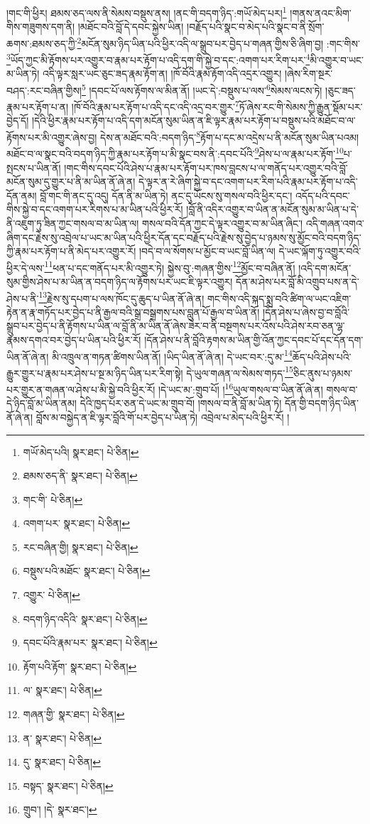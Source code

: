 །གང་གི་ཕྱིར། ཐམས་ཅད་ལས་ནི་སེམས་བསྡུས་ནས། །ནང་གི་བདག་ཉིད་:གཡོ་མེད་པར།\footnote{གཡོ་མེད་པའི།  སྣར་ཐང་།  པེ་ཅིན། } །གནས་ནའང་མིག་གིས་གཟུགས་དག་ནི། །མཐོང་བའི་བློ་དེ་དབང་སྐྱེས་ཡིན། །བརྗོད་པའི་སྣང་བ་མེད་པའི་སྣང་བ་ནི་སྲོག་ཆགས་:ཐམས་ཅད་ཀྱི་\footnote{ཐམས་ཅད་ནི་  སྣར་ཐང་།  པེ་ཅིན། }མངོན་སུམ་ཉིད་ཡིན་པའི་ཕྱིར་འདི་ལ་སྒྲུབ་པར་བྱེད་པ་གཞན་གྱིས་ཅི་ཞིག་བྱ། :གང་གིས་\footnote{གང་གི་  པེ་ཅིན། }ཡོད་ཀྱང་མི་རྟོགས་པར་འགྱུར་བ་རྣམ་པར་རྟོག་པ་འདི་དག་གི་སྐྱེ་བ་དང་:འགག་པར་རིག་པར་\footnote{འགག་པར་  སྣར་ཐང་།  པེ་ཅིན། }མི་འགྱུར་བ་ཡང་མ་ཡིན་ཏེ། འདི་ལྟར་སླར་ཡང་ཅུང་ཟད་རྣམ་རྟོག་ན། །ཁོ་བོའི་རྣམ་རྟོག་འདི་འདྲར་འགྱུར། །ཞེས་རིག་སྔར་བཤད་:རང་བཞིན་གྱིས།\footnote{རང་བཞིན་གྱི།  སྣར་ཐང་།  པེ་ཅིན། } །དབང་པོ་ལས་རྟོགས་ལ་མིན་ནོ། །ཡང་དེ་:བསྡུས་པ་ལས་\footnote{བསྡུས་པའི་མཐོང་  སྣར་ཐང་།  པེ་ཅིན། }སེམས་ལངས་ཏེ། །ཅུང་ཟད་རྣམ་པར་རྟོག་པ་ན། །ཁོ་བོའི་རྣམ་པར་རྟོག་པ་འདི་དང་འདི་འདྲ་བར་གྱུར་\footnote{འགྱུར་  པེ་ཅིན། }ཏོ་ཞེས་རང་གི་སེམས་ཀྱི་རྒྱུན་སྡོམ་པར་བྱེད་དོ། །དེའི་ཕྱིར་རྣམ་པར་རྟོག་པ་འདི་དག་མངོན་སུམ་ཡིན་ན་ཇི་ལྟར་རྣམ་པར་རྟོག་པ་བསྡུས་པའི་མཐོང་བ་ལ་རྟོགས་པར་མི་འགྱུར་ཞེས་བྱ། དེས་ན་མཐོང་བའི་:བདག་ཉིད་\footnote{བདག་ཉིད་འདིའི་  སྣར་ཐང་།  པེ་ཅིན། }རྟོག་པ་དང་མ་འདྲེས་པ་ནི་མངོན་སུམ་ཡིན་པའམ། མཐོང་བ་ལ་སྣང་བའི་བདག་ཉིད་ཀྱི་རྣམ་པར་རྟོག་པ་མི་སྣང་བས་ནི་:དབང་པོའི་\footnote{དབང་པོའི་རྣམ་པར་  སྣར་ཐང་།  པེ་ཅིན། }ཤེས་པ་ལ་རྣམ་པར་རྟོག་\footnote{རྟོག་པའི་རྟོག་  སྣར་ཐང་།  པེ་ཅིན། }པ་སྤངས་པ་ཡིན་ནོ། །གང་གིས་དབང་པོའི་ཤེས་པ་རྣམ་པར་རྟོག་པར་ཁས་བླངས་པ་ལ་གནོད་པར་འགྱུར་བའི་བློ་མངོན་སུམ་དུ་གྱུར་པ་ནི་མ་ཡིན་ནོ་ཞེ་ན། དེ་ལྟར་ན་རེ་ཞིག་སྐྱེ་བ་དང་འགག་པར་རིག་པའི་རྣམ་པར་རྟོག་པ་འདི་དོན་ནམ། བློ་གང་གི་ནང་དུ་འདུ། དོན་ནི་མ་ཡིན་ཏེ། ནང་དུ་ཡོངས་སུ་གསལ་བའི་ཕྱིར་དང་། འདོད་པའི་དབང་གིས་སྐྱེ་བ་དང་འགག་པར་རིགས་པ་མ་ཡིན་པའི་ཕྱིར་རོ། །བློ་ནི་འདིར་འགྱུར་བ་ཡིན་ན་མངོན་སུམ་མ་ཡིན་པ་དེ་ནི་འཇུག་ཏུ་ཟིན་ཀྱང་གསལ་བ་མ་ཡིན་ལ། གསལ་བའི་དོན་ཀྱང་དེ་ལྟར་འགྱུར་བ་མ་ཡིན་ཞིང་། འདི་གཞན་འགའ་ཞིག་དང་རྗེས་སུ་འབྲེལ་པ་ཡང་མ་ཡིན་པའི་ཕྱིར་དོན་དང་བརྗོད་པའི་རྗེས་སུ་བྱེད་པ་ཉམས་སུ་མྱོང་བའི་བདག་ཉིད་ཀྱི་རྣམ་པར་རྟོག་པ་ནི་མེད་པར་འགྱུར་རོ། །བདེ་བ་ལ་སོགས་པ་མྱོང་བ་ཡང་བློ་ཡིན་ལ། དེ་ཡང་ལྐོག་ཏུ་འགྱུར་བའི་ཕྱིར་དེ་ལས་\footnote{ལ་  སྣར་ཐང་།  པེ་ཅིན། }ཕན་པ་དང་གནོད་པར་མི་འགྱུར་ཏེ། སྐྱེས་བུ་:གཞན་གྱིས་\footnote{གཞན་གྱི་  སྣར་ཐང་།  པེ་ཅིན། }མྱོང་བ་བཞིན་ནོ། །འདི་དག་མངོན་སུམ་གྱིས་ཤེས་པ་མ་ཡིན་ན་བདག་ཉིད་ལ་རྟོགས་པར་ཡང་ཇི་ལྟར་འགྱུར། དོན་མ་ཤེས་པར་བློ་མི་འགྲུབ་པས་ན་དེ་ཤེས་པ་ནི་\footnote{ན་  སྣར་ཐང་།  པེ་ཅིན། }རྗེས་སུ་དཔག་པ་ལས་ཁོང་དུ་ཆུད་པ་ཡིན་ནོ་ཞེ་ན། གང་གིས་འདི་སྐད་སྨྲ་བའི་ཚིག་ལ་ཡང་འཇིག་རྟེན་ན་རྣ་གཏོད་པར་བྱེད་པ་ནི་རྒྱལ་བའི་སྒྲ་བསྒྲགས་པས་བླུན་པོ་རྒྱལ་བ་ཡིན་ནོ། །དོན་ཤེས་པ་ཞེས་བྱ་བ་བློའི་སྒྲུབ་པར་བྱེད་པ་ནི་རྟོགས་པ་ཡིན་ལ་བློ་ནི་མ་ཡིན་ནོ་ཞེས་ཟེར་བ་ནི་བསྔགས་པར་འོས་པའི་ཤེས་རབ་ཅན་ལྷ་རྣམས་དགའ་བར་བྱེད་པ་ཡིན་པའི་ཕྱིར་རོ། །དོན་ཤེས་པ་ནི་བློའི་རྟགས་མ་ཡིན་གྱི་འོན་ཀྱང་དབང་པོ་དང་དོན་དག་ཡིན་ནོ་ཞེ་ན། མི་འཁྲུལ་ན་གཏན་ཚིགས་ཡིན་ནོ། །ཡིད་ཡིན་ནོ་ཞེ་ན། དེ་ཡང་བར་:དུ་མ་\footnote{དུ་  སྣར་ཐང་།  པེ་ཅིན། }ཆོད་པའི་ཤེས་པའི་རྒྱུར་གྱུར་པ་རྣམ་པར་ཤེས་པ་སྔ་མ་ཉིད་ཡིན་པར་རིག་སྟེ། དེ་ཡུལ་གཞན་ལ་སེམས་གཏད་\footnote{བསྟད་  སྣར་ཐང་།  པེ་ཅིན། }ཅིང་ནུས་པ་ཉམས་པར་གྱུར་ན་གཞན་ལ་ཤེས་པ་མི་སྐྱེ་བའི་ཕྱིར་རོ། །དེ་ཡང་མ་:གྲུབ་པོ། །\footnote{གྲུབ་། །དེ་  སྣར་ཐང་། }ཡུལ་གསལ་བ་ཡིན་ནོ་ཞེ་ན། གསལ་བ་དེ་ཉིད་བློ་མ་ཡིན་ནམ། དེའི་ཁྱད་པར་ཅན་དེ་ཡང་མ་གྲུབ་བོ། །གསལ་བ་ནི་བློ་མ་ཡིན་ཏེ། དོན་གྱི་བདག་ཉིད་ཡིན་ནོ་ཞེ་ན། བློས་མ་བསྐྱེད་ན་ཇི་ལྟར་བློའི་གོ་པར་བྱེད་པ་ཡིན་ཏེ། འབྲེལ་པ་མེད་པའི་ཕྱིར་རོ། །
